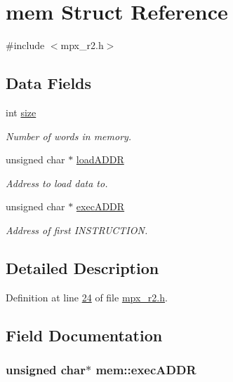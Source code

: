 \hypertarget{structmem}{
\section{mem Struct Reference}
\label{structmem}
}


{\ttfamily \#include $<$mpx\_\-r2.h$>$}

\subsection*{Data Fields}
\begin{DoxyCompactItemize}
\item 
int \hyperlink{structmem_a2f6285207fccce5cfe6a24037bd780c3}{size}
\begin{DoxyCompactList}\small\item\em Number of words in memory. \item\end{DoxyCompactList}\item 
unsigned char $\ast$ \hyperlink{structmem_a8f5a4db03ee0560e6bd4dd602ad753c0}{loadADDR}
\begin{DoxyCompactList}\small\item\em Address to load data to. \item\end{DoxyCompactList}\item 
unsigned char $\ast$ \hyperlink{structmem_a5340491e17307817e6dca3b1d260d18a}{execADDR}
\begin{DoxyCompactList}\small\item\em Address of first INSTRUCTION. \item\end{DoxyCompactList}\end{DoxyCompactItemize}


\subsection{Detailed Description}


Definition at line \hyperlink{mpx__r2_8h_source_l00024}{24} of file \hyperlink{mpx__r2_8h_source}{mpx\_\-r2.h}.



\subsection{Field Documentation}
\hypertarget{structmem_a5340491e17307817e6dca3b1d260d18a}{
\subsubsection[{execADDR}]{\setlength{\rightskip}{0pt plus 5cm}unsigned char$\ast$ {\bf mem::execADDR}}}
\label{structmem_a5340491e17307817e6dca3b1d260d18a}


